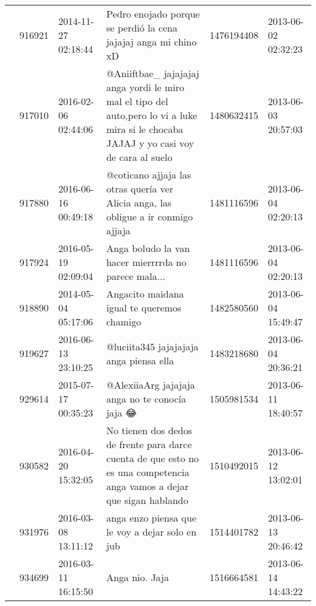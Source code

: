 \begin{tabular}{llllrl}
           & 916921  & 2014-11-27 02:18:44 &                                                                              Pedro enojado porque se perdió la cena jajajaj anga mi chino xD &  1476194408 & 2013-06-02 02:32:23 \\
           & 917010  & 2016-02-06 02:44:06 &     @Aniiftbae\_  jajajajaj anga yordi le miro mal el tipo del auto,pero lo vi a luke mira si le chocaba JAJAJ y yo casi voy de cara al suelo &  1480632415 & 2013-06-03 20:57:03 \\
           & 917880  & 2016-06-16 00:49:18 &                                                         @coticano ajjaja las otras quería  ver Alicia anga,  las obligue a ir conmigo ajjaja &  1481116596 & 2013-06-04 02:20:13 \\
           & 917924  & 2016-05-19 02:09:04 &                                                                                         Anga boludo la van hacer mierrrrda no parece mala... &  1481116596 & 2013-06-04 02:20:13 \\
           & 918890  & 2014-05-04 05:17:06 &                                                                                                   Angacito maidana igual te queremos chamigo &  1482580560 & 2013-06-04 15:49:47 \\
           & 919627  & 2016-06-13 23:10:25 &                                                                                                      @luciita345 jajajajaja anga piensa ella &  1483218680 & 2013-06-04 20:36:21 \\
           & 929614  & 2015-07-17 00:35:23 &                                                                                               @AlexiiaArg jajajaja anga no te conocía jaja 😂 &  1505981534 & 2013-06-11 18:40:57 \\
           & 930582  & 2016-04-20 15:32:05 &                      No tienen dos dedos de frente para darce cuenta de que esto no es una competencia anga vamos a dejar que sigan hablando &  1510492015 & 2013-06-12 13:02:01 \\
           & 931976  & 2016-03-08 13:11:12 &                                                                                              anga enzo piensa que le voy a dejar solo en jub &  1514401782 & 2013-06-13 20:46:42 \\
           & 934699  & 2016-03-11 16:15:50 &                                                                                                                               Anga nio. Jaja &  1516664581 & 2013-06-14 14:43:22 \\

\end{tabular}
